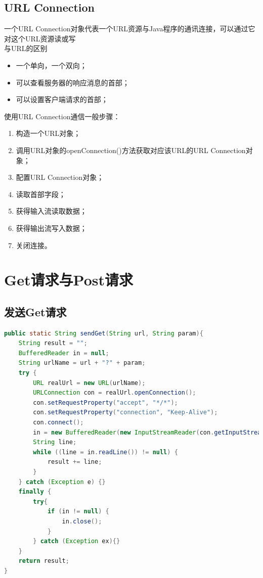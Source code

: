 \subsection{URL Connection}
\noindent 一个URL Connection对象代表一个URL资源与Java程序的通讯连接，可以通过它对这个URL资源读或写
\\ 与URL的区别
\begin{itemize}
	\item 一个单向，一个双向；
	\item 可以查看服务器的响应消息的首部；
	\item 可以设置客户端请求的首部；
\end{itemize}
使用URL Connection通信一般步骤：
\begin{enumerate}
	\item 构造一个URL对象；
	\item 调用URL对象的openConnection()方法获取对应该URL的URL Connection对象；
	\item 配置URL Connection对象；
	\item 读取首部字段；
	\item 获得输入流读取数据；
	\item 获得输出流写入数据；
	\item 关闭连接。
\end{enumerate}
\section{Get请求与Post请求}
\subsection{发送Get请求}
\begin{lstlisting}[language=java]
public static String sendGet(String url, String param){
	String result = "";
	BufferedReader in = null;
	String urlName = url + "?" + param;
	try {
		URL realUrl = new URL(urlName);
		URLConnection con = realUrl.openConnection();
		con.setRequestProperty("accept", "*/*");
		con.setRequestProperty("connection", "Keep-Alive");
		con.connect();
		in = new BufferedReader(new InputStreamReader(con.getInputStream()));
		String line;
		while ((line = in.readLine()) != null) {
			result += line;
		}
	} catch (Exception e) {}
	finally {
		try{
			if (in != null) {
				in.close();
			}
		} catch (Exception ex){}
	}
	return result;
}
\end{lstlisting}
